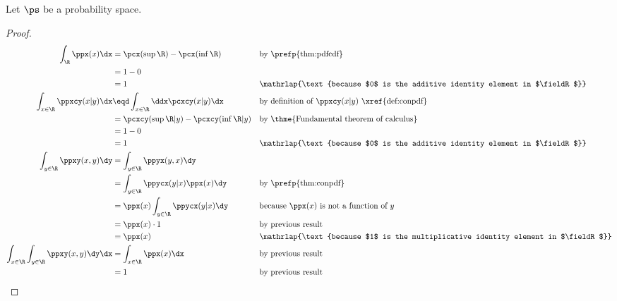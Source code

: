 \begin{theorem}
\label{thm:pdf1}
Let $\ps$ be a probability space.
\end{theorem}
\begin{proof}
\begin{align*}
  \int_{\R} \ppx(x) \dx
    &= \pcx(\sup\R) - \pcx(\inf\R)
    && \text{by \prefp{thm:pdfcdf}}
  \\&= 1 - 0
  \\&= 1
    && \mathrlap{\text{because $0$ is the additive identity element in $\fieldR$}}
  \\
  \int_{x\in\R} \ppxcy(x|y) \dx
    &\eqd \int_{x\in\R} \ddx\pcxcy(x|y) \dx
    &&    \text{by definition of $\ppxcy(x|y)$ \xref{def:conpdf}}
  \\&=    \pcxcy(\sup\R|y) - \pcxcy(\inf\R|y)
    &&    \text{by \thme{Fundamental theorem of calculus}}
  \\&=    1-0
  \\&=    1
    && \mathrlap{\text{because $0$ is the additive identity element in $\fieldR$}}
  \\
  \int_{y\in\R} \ppxy(x,y) \dy
    &= \int_{y\in\R} \ppyx(y,x) \dy
  \\&= \int_{y\in\R} \ppycx(y|x)\ppx(x) \dy  && \text{by \prefp{thm:conpdf}}
  \\&= \ppx(x)\int_{y\in\R} \ppycx(y|x) \dy  && \text{because $\ppx(x)$ is not a function of $y$}
  \\&= \ppx(x)\cdot1                         && \text{by previous result}
  \\&= \ppx(x)                               && \mathrlap{\text{because $1$ is the multiplicative identity element in $\fieldR$}}
  \\
  \int_{x\in\R}\int_{y\in\R} \ppxy(x,y) \dy\dx
    &= \int_{x\in\R}\ppx(x)\dx               && \text{by previous result}
  \\&= 1                                     && \text{by previous result}
\end{align*}
\end{proof}

